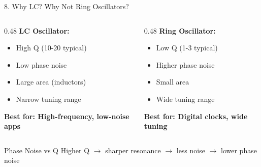 \documentclass[aspectratio=169, 11pt]{beamer}
\begin{document}
\begin{frame}{8. Why LC? Why Not Ring Oscillators?}
    \begin{columns}[T]
        \begin{column}{0.48\textwidth}
            \textbf{LC Oscillator:}
            \begin{itemize}
                \item High Q (10-20 typical)
                \item Low phase noise
                \item Large area (inductors)
                \item Narrow tuning range
            \end{itemize}
            \textcolor{mygreen}{\textbf{Best for: High-frequency, low-noise apps}}
        \end{column}
        \begin{column}{0.48\textwidth}
            \textbf{Ring Oscillator:}
            \begin{itemize}
                \item Low Q (1-3 typical)
                \item Higher phase noise
                \item Small area
                \item Wide tuning range
            \end{itemize}
            \textcolor{myorange}{\textbf{Best for: Digital clocks, wide tuning}}
        \end{column}
    \end{columns}

    \vspace{0.5em}
    \begin{block}{Phase Noise vs Q}
        Higher Q $\rightarrow$ sharper resonance $\rightarrow$ less noise $\rightarrow$ lower phase noise
    \end{block}
\end{frame}
\end{document}
